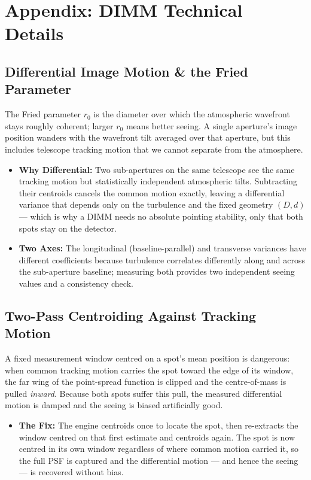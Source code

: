 \documentclass[11pt,a4paper]{article}
\begin{document}
\section{Appendix: DIMM Technical Details}

\subsection{Differential Image Motion \& the Fried Parameter}\label{app:dimmphys}
The Fried parameter $r_0$ is the diameter over which the atmospheric wavefront stays roughly coherent; larger $r_0$ means better seeing. A single aperture's image position wanders with the wavefront tilt averaged over that aperture, but this includes telescope tracking motion that we cannot separate from the atmosphere.
\begin{itemize}[leftmargin=*]
    \item \textbf{Why Differential:} Two sub-apertures on the same telescope see the same tracking motion but statistically independent atmospheric tilts. Subtracting their centroids cancels the common motion exactly, leaving a differential variance that depends only on the turbulence and the fixed geometry $(D,d)$ --- which is why a DIMM needs no absolute pointing stability, only that both spots stay on the detector.
    \item \textbf{Two Axes:} The longitudinal (baseline-parallel) and transverse variances have different coefficients because turbulence correlates differently along and across the sub-aperture baseline; measuring both provides two independent seeing values and a consistency check.
\end{itemize}

\subsection{Two-Pass Centroiding Against Tracking Motion}\label{app:twopass}
A fixed measurement window centred on a spot's mean position is dangerous: when common tracking motion carries the spot toward the edge of its window, the far wing of the point-spread function is clipped and the centre-of-mass is pulled \emph{inward}. Because both spots suffer this pull, the measured differential motion is damped and the seeing is biased artificially good.
\begin{itemize}[leftmargin=*]
    \item \textbf{The Fix:} The engine centroids once to locate the spot, then re-extracts the window centred on that first estimate and centroids again. The spot is now centred in its own window regardless of where common motion carried it, so the full PSF is captured and the differential motion --- and hence the seeing --- is recovered without bias.
\end{itemize}
\end{document}
